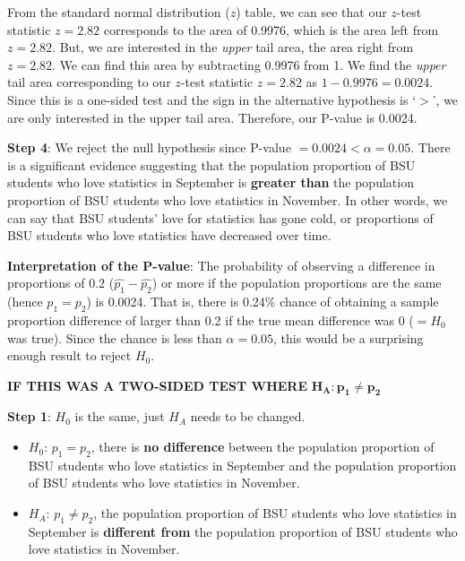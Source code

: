 \documentclass[12pt]{article}
\begin{document}
From the standard normal distribution ($z$) table, we can see that our $z$-test statistic $z = 2.82$ corresponds to the area of 0.9976, which is the area left from $z = 2.82$. But, we are interested in the \textit{upper} tail area, the area right from $z = 2.82$. We can find this area by subtracting 0.9976 from 1. We find the \textit{upper} tail area corresponding to our $z$-test statistic $z = 2.82$ as $1 - 0.9976 = 0.0024$. Since this is a one-sided test and the sign in the alternative hypothesis is `$>$', we are only interested in the upper tail area. Therefore, our P-value is 0.0024.

\noindent \textbf{Step 4}: We reject the null hypothesis since P-value $= 0.0024 < \alpha = 0.05$. There is a significant evidence suggesting that the population proportion of BSU students who love statistics in September is \textbf{greater than} the population proportion of BSU students who love statistics in November. In other words, we can say that BSU students' love for statistics has gone cold, or proportions of BSU students who love statistics have decreased over time.

\noindent \textbf{Interpretation of the P-value}: The probability of observing a difference in proportions of 0.2 ($\hat{p_1} - \hat{p_2}$) or more if the population proportions are the same (hence $p_1 = p_2$) is 0.0024. That is, there is 0.24\% chance of obtaining a sample proportion difference of larger than 0.2 if the true mean difference was 0 ($= H_0$ was true). Since the chance is less than $\alpha = 0.05$, this would be a surprising enough result to reject $H_0$.

\vspace{10 pt}

\textbf{IF THIS WAS A TWO-SIDED TEST WHERE} $\mathbf{H_A: p_1 \neq p_2}$

\vspace{10 pt}

\noindent \textbf{Step 1}: $H_0$ is the same, just $H_A$ needs to be changed.
\begin{itemize}
	\item $H_0$: $p_1 = p_2$, there is \textbf{no difference} between the population proportion of BSU students who love statistics in September and the population proportion of BSU students who love statistics in November.
	\item $H_A$: $p_1 \neq p_2$, the population proportion of BSU students who love statistics in September is \textbf{different from} the population proportion of BSU students who love statistics in November.
\end{itemize}
\end{document}
